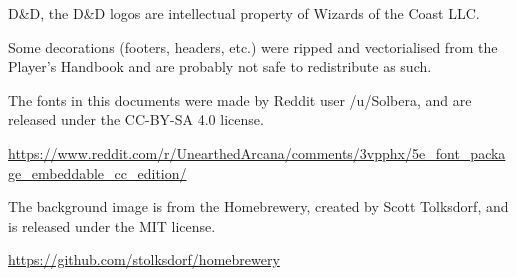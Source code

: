 \item D\&D, the D\&D logos are intellectual property of Wizards of the
  Coast LLC.

\item Some decorations (footers, headers, etc.) were ripped and
  vectorialised from the Player's Handbook and are probably not safe
  to redistribute as such.

\item The fonts in this documents were made by Reddit user /u/Solbera,
  and are released under the CC-BY-SA 4.0 license.

  \url{https://www.reddit.com/r/UnearthedArcana/comments/3vpphx/5e_font_package_embeddable_cc_edition/}

\item The background image is from the Homebrewery, created by Scott
  Tolksdorf, and is released under the MIT license.

  \url{https://github.com/stolksdorf/homebrewery}
